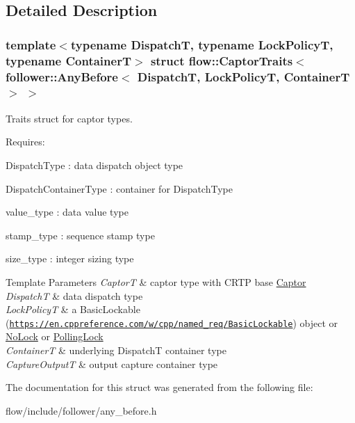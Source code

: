 \subsection{Detailed Description}
\subsubsection*{template$<$typename DispatchT, typename Lock\+PolicyT, typename ContainerT$>$\newline
struct flow\+::\+Captor\+Traits$<$ follower\+::\+Any\+Before$<$ Dispatch\+T, Lock\+Policy\+T, Container\+T $>$ $>$}

Traits struct for captor types. 

Requires\+:
\begin{DoxyItemize}
\item {\ttfamily Dispatch\+Type} \+: data dispatch object type
\item {\ttfamily Dispatch\+Container\+Type} \+: container for {\ttfamily Dispatch\+Type}
\item {\ttfamily value\+\_\+type} \+: data value type
\item {\ttfamily stamp\+\_\+type} \+: sequence stamp type
\item {\ttfamily size\+\_\+type} \+: integer sizing type
\end{DoxyItemize}


\begin{DoxyTemplParams}{Template Parameters}
{\em CaptorT} & captor type with C\+R\+TP base {\ttfamily \hyperlink{classflow_1_1_captor}{Captor}}\\
\hline
{\em DispatchT} & data dispatch type \\
\hline
{\em Lock\+PolicyT} & a Basic\+Lockable (\href{https://en.cppreference.com/w/cpp/named_req/BasicLockable}{\tt https\+://en.\+cppreference.\+com/w/cpp/named\+\_\+req/\+Basic\+Lockable}) object or \hyperlink{structflow_1_1_no_lock}{No\+Lock} or \hyperlink{structflow_1_1_polling_lock}{Polling\+Lock} \\
\hline
{\em ContainerT} & underlying {\ttfamily DispatchT} container type \\
\hline
{\em Capture\+OutputT} & output capture container type \\
\hline
\end{DoxyTemplParams}


The documentation for this struct was generated from the following file\+:\begin{DoxyCompactItemize}
\item 
flow/include/follower/any\+\_\+before.\+h\end{DoxyCompactItemize}
